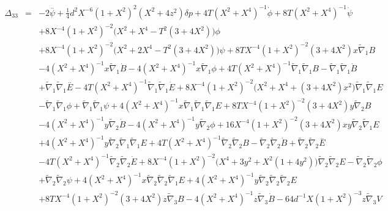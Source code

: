 \documentclass[10pt,letterpaper]{article}
\numberwithin{equation}{section}
\begin{document}
\begin{appendices}
\begin{eqnarray}
\\  \nonumber\\ 
\Delta_{33}&=& -2 \overset{..}{\psi} + \tfrac{1}{4} d^2 X^{-6} (1 + X^2)^2 (X^2 + 4 z^2) \delta p + 4 T (X^2 + X^4)^{-1} \dot{\phi} + 8 T (X^2 + X^4)^{-1} \dot{\psi} \nonumber \\ 
&& + 8 X^{-4} (1 + X^2)^{-2} \bigl(X^2 + X^4 -  T^2 (3 + 4 X^2)\bigr) \phi \nonumber \\ 
&& + 8 X^{-4} (1 + X^2)^{-2} \bigl(X^2 + 2 X^4 -  T^2 (3 + 4 X^2)\bigr) \psi + 8 T X^{-4} (1 + X^2)^{-2} (3 + 4 X^2) x \tilde{\nabla}_{1}B \nonumber \\ 
&& - 4 (X^2 + X^4)^{-1} x \tilde{\nabla}_{1}\dot{B} - 4 (X^2 + X^4)^{-1} x \tilde{\nabla}_{1}\phi + 4 T (X^2 + X^4)^{-1} \tilde{\nabla}_{1}\tilde{\nabla}_{1}B -  \tilde{\nabla}_{1}\tilde{\nabla}_{1}\dot{B} \nonumber \\ 
&& + \tilde{\nabla}_{1}\tilde{\nabla}_{1}\overset{..}{E} - 4 T (X^2 + X^4)^{-1} \tilde{\nabla}_{1}\tilde{\nabla}_{1}\dot{E} + 8 X^{-4} (1 + X^2)^{-2} \bigl(X^2 + X^4 + (3 + 4 X^2) x^2\bigr) \tilde{\nabla}_{1}\tilde{\nabla}_{1}E \nonumber \\ 
&& -  \tilde{\nabla}_{1}\tilde{\nabla}_{1}\phi + \tilde{\nabla}_{1}\tilde{\nabla}_{1}\psi + 4 (X^2 + X^4)^{-1} x \tilde{\nabla}_{1}\tilde{\nabla}_{1}\tilde{\nabla}_{1}E + 8 T X^{-4} (1 + X^2)^{-2} (3 + 4 X^2) y \tilde{\nabla}_{2}B \nonumber \\ 
&& - 4 (X^2 + X^4)^{-1} y \tilde{\nabla}_{2}\dot{B} - 4 (X^2 + X^4)^{-1} y \tilde{\nabla}_{2}\phi + 16 X^{-4} (1 + X^2)^{-2} (3 + 4 X^2) x y \tilde{\nabla}_{2}\tilde{\nabla}_{1}E \nonumber \\ 
&& + 4 (X^2 + X^4)^{-1} y \tilde{\nabla}_{2}\tilde{\nabla}_{1}\tilde{\nabla}_{1}E + 4 T (X^2 + X^4)^{-1} \tilde{\nabla}_{2}\tilde{\nabla}_{2}B -  \tilde{\nabla}_{2}\tilde{\nabla}_{2}\dot{B} + \tilde{\nabla}_{2}\tilde{\nabla}_{2}\overset{..}{E} \nonumber \\ 
&& - 4 T (X^2 + X^4)^{-1} \tilde{\nabla}_{2}\tilde{\nabla}_{2}\dot{E} + 8 X^{-4} (1 + X^2)^{-2} \bigl(X^4 + 3 y^2 + X^2 (1 + 4 y^2)\bigr) \tilde{\nabla}_{2}\tilde{\nabla}_{2}E -  \tilde{\nabla}_{2}\tilde{\nabla}_{2}\phi \nonumber \\ 
&& + \tilde{\nabla}_{2}\tilde{\nabla}_{2}\psi + 4 (X^2 + X^4)^{-1} x \tilde{\nabla}_{2}\tilde{\nabla}_{2}\tilde{\nabla}_{1}E + 4 (X^2 + X^4)^{-1} y \tilde{\nabla}_{2}\tilde{\nabla}_{2}\tilde{\nabla}_{2}E \nonumber \\ 
&& + 8 T X^{-4} (1 + X^2)^{-2} (3 + 4 X^2) z \tilde{\nabla}_{3}B - 4 (X^2 + X^4)^{-1} z \tilde{\nabla}_{3}\dot{B} - 64 d^{-1} X (1 + X^2)^{-3} z \tilde{\nabla}_{3}V \nonumber \\ 

\end{eqnarray}
\end{appendices}
\end{document}

